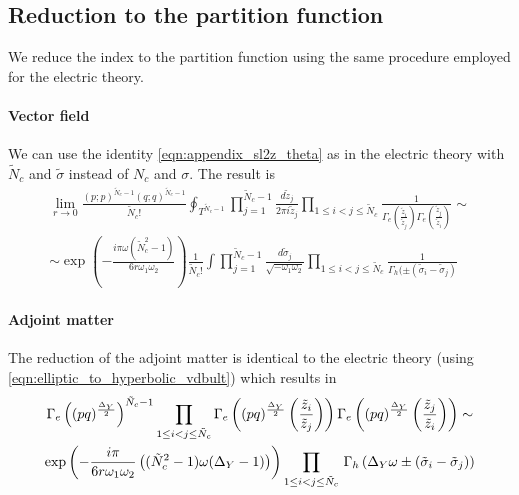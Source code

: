 \subsection{Reduction to the partition function}
We reduce the index to the partition function using the same procedure employed for the electric theory.

\paragraph{Vector field}
We can use the identity \eqref{eqn:appendix_sl2z_theta} as in the electric theory with $\tilde{N}_c$ and $\tilde{\sigma}$ instead of $N_c$ and $\sigma$.  The result is
\begin{multline}
\lim_{r \rightarrow 0} \frac{ (p;p)^{\tilde{N}_c- 1}(q;q)^{\tilde{N}_c- 1} }{ \tilde{N}_c ! }
\oint_{T^{\tilde{N}_c -1}} \prod_{j=1}^{\tilde{N}_c -1 } \frac{ d \tilde{z}_j}{2 \pi i \tilde{z}_j} \prod_{1 \leq i<j \leq \tilde{N}_c } \frac{1}{\Gamma_e( \frac{\tilde{z}_i}{\tilde{z}_j} )\Gamma_e( \frac{\tilde{z}_j}{\tilde{z}_i} )} \sim
\\
\sim 
\exp \left(  
- \frac{ i \pi \omega (\tilde{N}_c^2 -1)}{6 r \omega_1 \omega_2}
\right)
 \frac{1}{\tilde{N}_c !} \int \prod_{j=1}^{\tilde{N}_c -1 } \frac{d \tilde{\sigma}_j}{\sqrt{- \omega_1 \omega_2} } \prod_{1 \leq i<j \leq \tilde{N}_c }\frac{1}{\Gamma_h( \pm (\tilde{\sigma}_i - \tilde{\sigma}_j) }
\end{multline}

\paragraph{Adjoint matter}
The reduction of the adjoint matter is identical to the electric theory (using \eqref{eqn:elliptic_to_hyperbolic_vdbult}) which results in
\begin{multline}
 \Gamma_e \left((pq)^{\frac{\Delta_Y}{2}} \right)^{\tilde{N}_c -1} 
 \prod_{1 \leq i <j \leq \tilde{N}_c} 
\Gamma_e \left( (pq)^{\frac{\Delta_Y}{2}} \left( { \tilde{z}_i \over \tilde{z}_j} \right) \right) \Gamma_e \left( (pq)^{\frac{\Delta_Y}{2}} \left( { \tilde{z}_j \over \tilde{z}_i} \right) \right) \sim \\
 \exp \left(- \frac{i \pi} {6 r \omega_1 \omega_2 }  \left( (\tilde{N}_c^2-1) \omega (\Delta_Y - 1)  \right) \right)   \prod_{1 \leq i <j \leq \tilde{N}_c} 
  \, \Gamma_h \left( \Delta_Y \omega \pm (\tilde{\sigma}_i - \tilde{\sigma}_j) \right) 
\end{multline}

